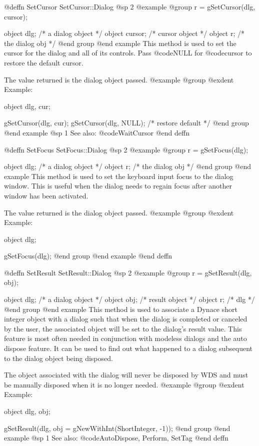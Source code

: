 @deffn {SetCursor} SetCursor::Dialog
@sp 2
@example
@group
r = gSetCursor(dlg, cursor);

object  dlg;      /*  a dialog object  */
object  cursor;   /*  cursor object    */
object  r;        /*  the dialog obj   */
@end group
@end example
This method is used to set the cursor for the dialog and all of its
controls.  Pass @code{NULL} for @code{cursor} to restore the default
cursor.

The value returned is the dialog object passed.
@example
@group
@exdent Example:

object  dlg, cur;

gSetCursor(dlg, cur);
gSetCursor(dlg, NULL);  /*  restore default  */
@end group
@end example
@sp 1
See also:  @code{WaitCursor}
@end deffn




@deffn {SetFocus} SetFocus::Dialog
@sp 2
@example
@group
r = gSetFocus(dlg);

object  dlg;   /*  a dialog object  */
object  r;     /*  the dialog obj   */
@end group
@end example
This method is used to set the keyboard input focus to the dialog window.
This is useful when the dialog needs to regain focus after another window
has been activated.

The value returned is the dialog object passed.
@example
@group
@exdent Example:

object  dlg;

gSetFocus(dlg);
@end group
@end example
@end deffn




@deffn {SetResult} SetResult::Dialog
@sp 2
@example
@group
r = gSetResult(dlg, obj);

object  dlg;    /*  a dialog object  */
object  obj;    /*  result object    */
object  r;      /*  dlg              */
@end group
@end example
This method is used to associate a Dynace short integer object with a
dialog such that when the dialog is completed or canceled by the user,
the associated object will be set to the dialog's result value.  This
feature is most often needed in conjunction with modeless dialogs and
the auto dispose feature.  It can be used to find out what happened to a
dialog subsequent to the dialog object being disposed.

The object associated with the dialog will never be disposed by WDS
and must be manually disposed when it is no longer needed.
@example
@group
@exdent Example:

object  dlg, obj;

gSetResult(dlg, obj = gNewWithInt(ShortInteger, -1));
@end group
@end example
@sp 1
See also:  @code{AutoDispose, Perform, SetTag}
@end deffn










